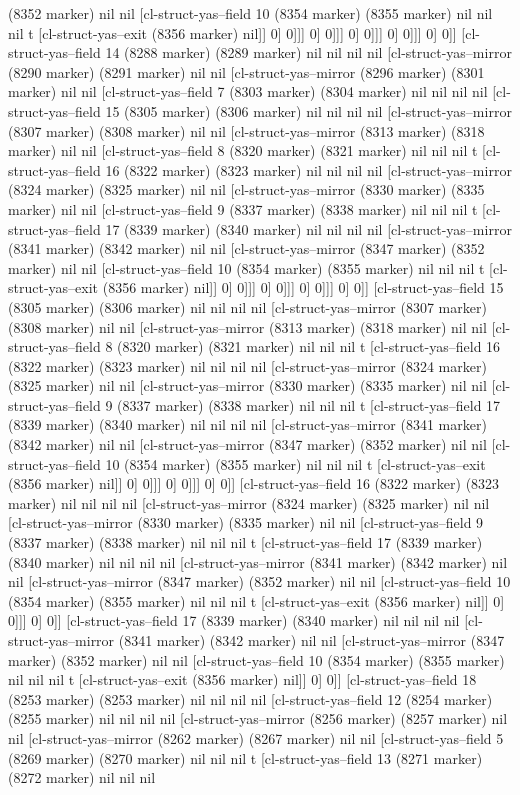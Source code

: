{{(8352 marker) nil nil [cl-struct-yas--field 10 (8354 marker) (8355 marker) nil nil nil t [cl-struct-yas--exit (8356 marker) nil]] 0] 0]]] 0] 0]]] 0] 0]]] 0] 0]]] 0] 0]] [cl-struct-yas--field 14 (8288 marker) (8289 marker) nil nil nil nil [cl-struct-yas--mirror (8290 marker) (8291 marker) nil nil [cl-struct-yas--mirror (8296 marker) (8301 marker) nil nil [cl-struct-yas--field 7 (8303 marker) (8304 marker) nil nil nil nil [cl-struct-yas--field 15 (8305 marker) (8306 marker) nil nil nil nil [cl-struct-yas--mirror (8307 marker) (8308 marker) nil nil [cl-struct-yas--mirror (8313 marker) (8318 marker) nil nil [cl-struct-yas--field 8 (8320 marker) (8321 marker) nil nil nil t [cl-struct-yas--field 16 (8322 marker) (8323 marker) nil nil nil nil [cl-struct-yas--mirror (8324 marker) (8325 marker) nil nil [cl-struct-yas--mirror (8330 marker) (8335 marker) nil nil [cl-struct-yas--field 9 (8337 marker) (8338 marker) nil nil nil t [cl-struct-yas--field 17 (8339 marker) (8340 marker) nil nil nil nil [cl-struct-yas--mirror (8341 marker) (8342 marker) nil nil [cl-struct-yas--mirror (8347 marker) (8352 marker) nil nil [cl-struct-yas--field 10 (8354 marker) (8355 marker) nil nil nil t [cl-struct-yas--exit (8356 marker) nil]] 0] 0]]] 0] 0]]] 0] 0]]] 0] 0]] [cl-struct-yas--field 15 (8305 marker) (8306 marker) nil nil nil nil [cl-struct-yas--mirror (8307 marker) (8308 marker) nil nil [cl-struct-yas--mirror (8313 marker) (8318 marker) nil nil [cl-struct-yas--field 8 (8320 marker) (8321 marker) nil nil nil t [cl-struct-yas--field 16 (8322 marker) (8323 marker) nil nil nil nil [cl-struct-yas--mirror (8324 marker) (8325 marker) nil nil [cl-struct-yas--mirror (8330 marker) (8335 marker) nil nil [cl-struct-yas--field 9 (8337 marker) (8338 marker) nil nil nil t [cl-struct-yas--field 17 (8339 marker) (8340 marker) nil nil nil nil [cl-struct-yas--mirror (8341 marker) (8342 marker) nil nil [cl-struct-yas--mirror (8347 marker) (8352 marker) nil nil [cl-struct-yas--field 10 (8354 marker) (8355 marker) nil nil nil t [cl-struct-yas--exit (8356 marker) nil]] 0] 0]]] 0] 0]]] 0] 0]] [cl-struct-yas--field 16 (8322 marker) (8323 marker) nil nil nil nil [cl-struct-yas--mirror (8324 marker) (8325 marker) nil nil [cl-struct-yas--mirror (8330 marker) (8335 marker) nil nil [cl-struct-yas--field 9 (8337 marker) (8338 marker) nil nil nil t [cl-struct-yas--field 17 (8339 marker) (8340 marker) nil nil nil nil [cl-struct-yas--mirror (8341 marker) (8342 marker) nil nil [cl-struct-yas--mirror (8347 marker) (8352 marker) nil nil [cl-struct-yas--field 10 (8354 marker) (8355 marker) nil nil nil t [cl-struct-yas--exit (8356 marker) nil]] 0] 0]]] 0] 0]] [cl-struct-yas--field 17 (8339 marker) (8340 marker) nil nil nil nil [cl-struct-yas--mirror (8341 marker) (8342 marker) nil nil [cl-struct-yas--mirror (8347 marker) (8352 marker) nil nil [cl-struct-yas--field 10 (8354 marker) (8355 marker) nil nil nil t [cl-struct-yas--exit (8356 marker) nil]] 0] 0]] [cl-struct-yas--field 18 (8253 marker) (8253 marker) nil nil nil nil [cl-struct-yas--field 12 (8254 marker) (8255 marker) nil nil nil nil [cl-struct-yas--mirror (8256 marker) (8257 marker) nil nil [cl-struct-yas--mirror (8262 marker) (8267 marker) nil nil [cl-struct-yas--field 5 (8269 marker) (8270 marker) nil nil nil t [cl-struct-yas--field 13 (8271 marker) (8272 marker) nil nil nil }}
